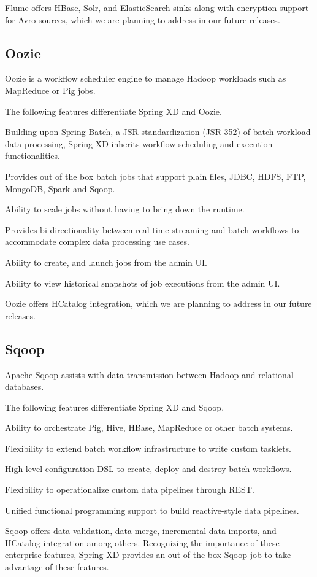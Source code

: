 Flume offers HBase, Solr, and ElasticSearch sinks along with encryption support
for Avro sources, which we are planning to address in our future releases.

\subsection{Oozie}
Oozie\cite{oozie} is a workflow scheduler engine to manage Hadoop \cite{hadoop} 
workloads such as MapReduce or Pig jobs.

The following features differentiate Spring XD and Oozie.

\begin{itemize*}
\item Building upon Spring Batch, a JSR standardization (JSR-352) of batch
workload data processing, Spring XD inherits workflow scheduling and execution
functionalities.
\item Provides out of the box batch jobs that support plain files, JDBC, HDFS,
FTP, MongoDB, Spark and Sqoop.
\item Ability to scale jobs without having to bring down the runtime.
\item Provides bi-directionality between real-time streaming and batch 
workflows to accommodate complex data processing use cases.
\item Ability to create, and launch jobs from the admin UI.
\item Ability to view historical snapshots of job executions from the admin UI.
\end{itemize*}

Oozie offers HCatalog integration, which we are planning to address in our 
future releases.

\subsection{Sqoop}
Apache Sqoop\cite{sqoop} assists with data transmission between Hadoop and relational
databases.

The following features differentiate Spring XD and Sqoop.

\begin{itemize*}
\item Ability to orchestrate Pig, Hive, HBase, MapReduce or other batch systems.
\item Flexibility to extend batch workflow infrastructure to write custom tasklets.
\item High level configuration DSL to create, deploy and destroy batch workflows.
\item Flexibility to operationalize custom data pipelines through REST.
\item Unified functional programming support to build reactive-style data pipelines.
\end{itemize*}

Sqoop offers data validation, data merge, incremental data imports, and HCatalog
integration among others. Recognizing the importance of these enterprise features,
Spring XD provides an out of the box Sqoop job to take advantage of these features.
